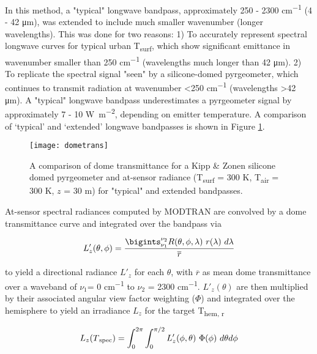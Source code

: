 In this method, a "typical" longwave bandpass, approximately 250 - 2300 \si{\centi\meter^{-1}} (4 - 42 \si{\micro\meter}), was extended to include much smaller wavenumber (longer wavelengths). This was done for two reasons: 1) To accurately represent spectral longwave curves for typical urban T\textsubscript{surf}, which show significant emittance in wavenumber smaller than 250 \si{cm^{-1}} (wavelengths much longer than 42 \si{\micro\meter}). 2) To replicate the spectral signal "seen" by a silicone-domed pyrgeometer, which continues to transmit radiation at wavenumber \textless 250 \si{cm^{-1}} (wavelengths \textgreater 42 \si{\micro\meter}). A "typical" longwave bandpass underestimates a pyrgeometer signal by approximately 7 - 10 \si{\watt\per\square\meter}, depending on emitter temperature. A comparison of ‘typical’ and ‘extended’ longwave bandpasses is shown in Figure \ref{dometrans}.

\begin{figure}[H]
	\texttt{[image: dometrans]}
	\caption{A comparison of dome transmittance for a Kipp \& Zonen silicone domed pyrgeometer and at-sensor radiance (T\textsubscript{surf} = 300 \si{K}, T\textsubscript{air} = 300 \si{K}, $z$ = 30 \si{m})  for "typical" and extended bandpasses.}
	\label{dometrans}
\end{figure}

At-sensor spectral radiances computed by MODTRAN are convolved by a dome transmittance curve and integrated over the bandpass via 

\begin{equation}
\label{work1}
	L'_z (\theta, \phi) = \frac{\bigints_{\nu_1}^{\nu_2} R(\theta, \phi, \lambda) ~ r(\lambda) ~ d\lambda}{\overline{r}}
\end{equation}

\noindent to yield a directional radiance $ L'_z $ for each $\theta$, with $\overline{r}$ as mean dome transmittance over a waveband of $\nu_1 $= 0 \si{cm^{-1}} to $\nu_2$ = 2300 \si{cm^{-1}}. $ L'_z (\theta) $ are then multiplied by their associated angular view factor weighting ($\Phi$) and integrated over the hemisphere to yield an irradiance $ L_z $ for the target T\textsubscript{hem, r}

\begin{equation}
\label{work2}
	L_z (T\textsubscript{spec}) = \int_{0}^{2\pi}\int_{0}^{\pi/2} L'_z (\phi, \theta) ~ \Phi (\phi) ~ d\theta d\phi
\end{equation}

